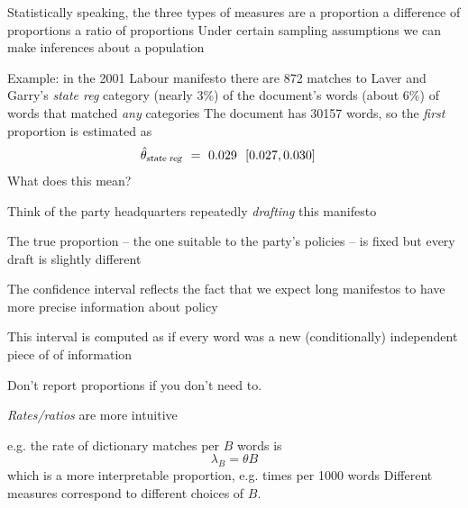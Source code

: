 \documentclass{mediumfoils}
\begin{document}

 Statistically speaking, the three types of measures are
\ita
\itm a proportion
\itm a difference of proportions
\itm a ratio of proportions
\itz
Under certain sampling assumptions we can make inferences about a population

%


Example: in the 2001 Labour manifesto there are 872 matches to Laver and Garry's \textsl{state reg} category
\ita
{} (nearly 3\%) of the document's words
 (about 6\%) of words that matched \textsl{any} categories
\itz
 The document has 30157 words, so the \textsl{first} proportion is estimated as 
\begin{align*}
\hat{\theta}_\text{\textsl{state reg}} & ~=~ 0.029 ~~[0.027, 0.030]
\end{align*}
What does this mean?  


Think of the party headquarters repeatedly \textsl{drafting} this manifesto

The true proportion -- the one suitable to the party's policies -- is fixed but every draft is slightly different

The confidence interval reflects the fact that we expect long manifestos to have more precise information about policy

This interval is computed as if every word was a new (conditionally) independent piece of of information


Don't report proportions if you don't need to.  

\textsl{Rates/ratios} are more intuitive

e.g. the rate of dictionary matches per $B$ words is
\[
\lambda_B = \theta B
\]
which is a more interpretable proportion, 
e.g. 
\ita
{} times per 1000 words
\itz
Different measures correspond to different choices of $B$.
\end{document}
